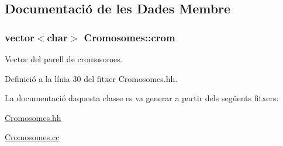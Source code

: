 \subsection{Documentació de les Dades Membre}
\subsubsection[{\texorpdfstring{crom}{crom}}]{\setlength{\rightskip}{0pt plus 5cm}vector$<$char$>$ Cromosomes\+::crom\hspace{0.3cm}{\ttfamily [private]}}\hypertarget{class_cromosomes_a663df9407657383482e40832eca6e91a}{}\label{class_cromosomes_a663df9407657383482e40832eca6e91a}


Vector del parell de cromosomes. 



Definició a la línia 30 del fitxer Cromosomes.\+hh.



La documentació d\textquotesingle{}aquesta classe es va generar a partir dels següents fitxers\+:\begin{DoxyCompactItemize}
\item 
\hyperlink{_cromosomes_8hh}{Cromosomes.\+hh}\item 
\hyperlink{_cromosomes_8cc}{Cromosomes.\+cc}\end{DoxyCompactItemize}
